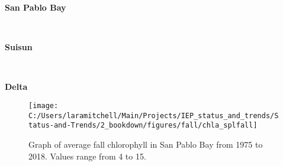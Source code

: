 \documentclass[
]{book}
\begin{document}
\begin{panel-grid}

\begin{columns-nocenter}

\begin{column800}

\textbf{San Pablo Bay}

\end{column800}

\begin{column40}

~

\end{column40}

\begin{column800}

\textbf{Suisun}

\end{column800}

\begin{column40}

~

\end{column40}

\begin{column800}

\textbf{Delta}

\end{column800}

\end{columns-nocenter}

\begin{columns-nocenter}

\begin{column800}

\begin{expand}

\begin{figure}
\texttt{[image: C:/Users/laramitchell/Main/Projects/IEP\_status\_and\_trends/Status-and-Trends/2\_bookdown/figures/fall/chla\_splfall]} \caption{Graph of average fall chlorophyll in San Pablo Bay from 1975 to 2018. Values range from 4 to 15.}\label{fig:unnamed-chunk-108}
\end{figure}

\end{expand}

\end{column800}

\begin{column40}

~


\end{column40}
\end{columns-nocenter}
\end{panel-grid}
\end{document}
